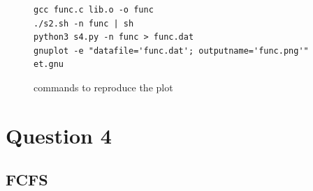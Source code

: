 \documentclass[12pt]{article}
\begin{document}
\begin{figure}[h!]
	\begin{verbatim}
gcc func.c lib.o -o func
./s2.sh -n func | sh
python3 s4.py -n func > func.dat
gnuplot -e "datafile='func.dat'; outputname='func.png'" et.gnu
	\end{verbatim}
	\caption{commands to reproduce the plot}\label{code:commands}
\end{figure}

\newpage

\section*{Question 4}

\subsection*{FCFS}
\end{document}
